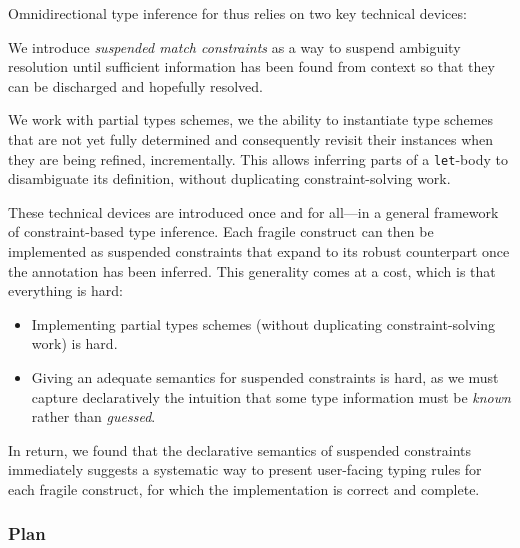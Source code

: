 \documentclass[acmsmall,screen,nonacm]{acmart}
\begin{document}
Omnidirectional type inference for \ML thus relies on two key technical devices:
\begin{enumerate*}
\item
  We introduce \emph{suspended match constraints} as a way to suspend
  ambiguity resolution until sufficient information has been found from
  context so that they can be discharged and hopefully resolved.
\item
  We work with partial types schemes, \ie we the ability to instantiate type
  schemes that are not yet fully determined and consequently revisit their
  instances when they are being refined, incrementally. This allows
  inferring parts of a \texttt{let}-body to disambiguate its definition,
  without duplicating constraint-solving work.
\end{enumerate*}

These technical devices are introduced once and for all---in a general
framework of constraint-based type inference. Each fragile \ML construct can
then be implemented as suspended constraints that expand to its robust
counterpart once the annotation has been inferred. This generality comes at
a cost, which is that everything is hard:
\begin{itemize}
\item Implementing partial types schemes (without duplicating
  constraint-solving work) is hard.
\item Giving an adequate semantics for suspended constraints is hard, as we
  must capture declaratively the intuition that some type information must be
  \emph{known} rather than \emph{guessed}.
\end{itemize}
In return, we found that the declarative semantics of suspended constraints
immediately suggests a systematic way to present user-facing typing rules
for each fragile construct, for which the implementation is correct and
complete.

\subsubsection* {Plan}
\end{document}
